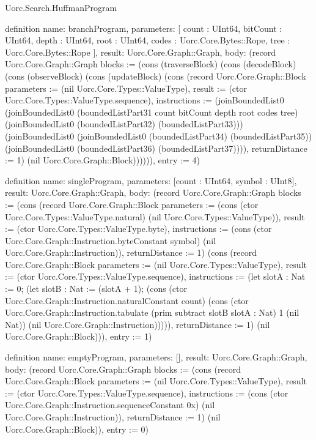 \begin{lexlean}{Uorc.Search.HuffmanProgram}
\begin{semanticmodule}
definition{
  name: branchProgram,
  parameters: [
    count : UInt64,
    bitCount : UInt64,
    depth : UInt64,
    root : UInt64,
    codes : Uorc.Core.Bytes::Rope,
    tree : Uorc.Core.Bytes::Rope
  ],
  result: Uorc.Core.Graph::Graph,
  body: (record Uorc.Core.Graph::Graph {blocks := (cons (traverseBlock) (cons (decodeBlock) (cons (observeBlock) (cons (updateBlock) (cons (record Uorc.Core.Graph::Block {parameters := (nil Uorc.Core.Types::ValueType), result := (ctor Uorc.Core.Types::ValueType.sequence), instructions := (joinBoundedList0 (joinBoundedList0 (boundedListPart31 count bitCount depth root codes tree) (joinBoundedList0 (boundedListPart32) (boundedListPart33))) (joinBoundedList0 (joinBoundedList0 (boundedListPart34) (boundedListPart35)) (joinBoundedList0 (boundedListPart36) (boundedListPart37)))), returnDistance := 1}) (nil Uorc.Core.Graph::Block)))))), entry := 4})
}

definition{
  name: singleProgram,
  parameters: [count : UInt64, symbol : UInt8],
  result: Uorc.Core.Graph::Graph,
  body: (record Uorc.Core.Graph::Graph {blocks := (cons (record Uorc.Core.Graph::Block {parameters := (cons (ctor Uorc.Core.Types::ValueType.natural) (nil Uorc.Core.Types::ValueType)), result := (ctor Uorc.Core.Types::ValueType.byte), instructions := (cons (ctor Uorc.Core.Graph::Instruction.byteConstant symbol) (nil Uorc.Core.Graph::Instruction)), returnDistance := 1}) (cons (record Uorc.Core.Graph::Block {parameters := (nil Uorc.Core.Types::ValueType), result := (ctor Uorc.Core.Types::ValueType.sequence), instructions := (let slotA : Nat := 0; (let slotB : Nat := (slotA + 1); (cons (ctor Uorc.Core.Graph::Instruction.naturalConstant count) (cons (ctor Uorc.Core.Graph::Instruction.tabulate (prim subtract slotB slotA : Nat) 1 (nil Nat)) (nil Uorc.Core.Graph::Instruction))))), returnDistance := 1}) (nil Uorc.Core.Graph::Block))), entry := 1})
}

definition{
  name: emptyProgram,
  parameters: [],
  result: Uorc.Core.Graph::Graph,
  body: (record Uorc.Core.Graph::Graph {blocks := (cons (record Uorc.Core.Graph::Block {parameters := (nil Uorc.Core.Types::ValueType), result := (ctor Uorc.Core.Types::ValueType.sequence), instructions := (cons (ctor Uorc.Core.Graph::Instruction.sequenceConstant 0x) (nil Uorc.Core.Graph::Instruction)), returnDistance := 1}) (nil Uorc.Core.Graph::Block)), entry := 0})
}


\end{semanticmodule}
\end{lexlean}
